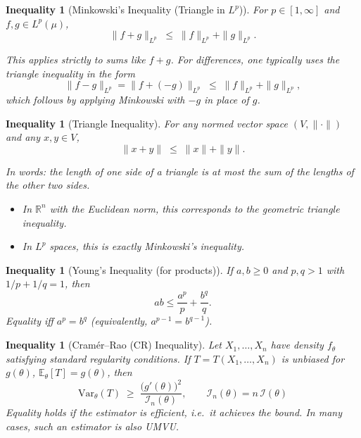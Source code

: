 \documentclass[11pt]{article}
\theoremstyle{plain}
\newtheorem{inequality}[theorem]{Inequality}
\theoremstyle{definition}
\theoremstyle{remark}
\newcommand{\E}{\mathbb{E}}
\newcommand{\Var}{\mathrm{Var}}
\newcommand{\1}{\mathbbm{1}}
\begin{document}
\newpage

\begin{inequality}[Minkowski’s Inequality (Triangle in $L^p$)]
For $p \in [1,\infty]$ and $f,g \in L^p(\mu)$,
\[
\|f+g\|_{L^p} \;\le\; \|f\|_{L^p} + \|g\|_{L^p}.
\]

\noindent This applies strictly to sums like $f+g$. For differences, one typically uses
the triangle inequality in the form
\[
\|f-g\|_{L^p} = \|f+(-g)\|_{L^p} \;\le\; \|f\|_{L^p} + \|g\|_{L^p},
\]
which follows by applying Minkowski with $-g$ in place of $g$.
\end{inequality}

\vspace{1em}

\begin{inequality}[Triangle Inequality]
For any normed vector space $(V,\|\cdot\|)$ and any $x,y \in V$, 
\[
\|x+y\| \;\le\; \|x\| + \|y\|.
\]

\noindent In words: the length of one side of a triangle is at most the
sum of the lengths of the other two sides.

\begin{itemize}
  \item In $\mathbb{R}^n$ with the Euclidean norm, this corresponds to the
        geometric triangle inequality.
  \item In $L^p$ spaces, this is exactly Minkowski’s inequality.
\end{itemize}
\end{inequality}

\vspace{1em}

\begin{inequality}[Young’s Inequality (for products)]
If $a,b\ge 0$ and $p,q>1$ with $1/p+1/q=1$, then
\[
ab \le \frac{a^p}{p}+\frac{b^q}{q}.
\]
\emph{Equality} iff $a^p=b^q$ (equivalently, $a^{p-1}=b^{q-1}$).
\end{inequality}

\vspace{1em}

\begin{inequality}[Cramér--Rao (CR) Inequality]
Let $X_1,\dots,X_n$ have density $f_\theta$ satisfying standard regularity conditions. If $T=T(X_1,\dots,X_n)$ is unbiased for $g(\theta)$, $\E_\theta[T]=g(\theta)$, then
\[
\Var_\theta(T) \;\ge\; \frac{\big(g'(\theta)\big)^2}{\mathcal{I}_n(\theta)}, 
\qquad \mathcal{I}_n(\theta)=n\,\mathcal{I}(\theta)
\]
\emph{Equality} holds if the estimator is efficient, i.e.\ it achieves the bound. 
In many cases, such an estimator is also UMVU.
\end{inequality}
\end{document}
